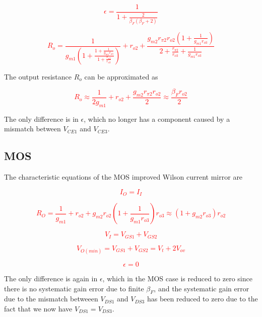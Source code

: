 \textcolor{red}{
\begin{equation}
\epsilon = \frac{1}{1+\frac{2}{\beta_{F} (\beta_{F} + 2)}}
\end{equation}
}

\textcolor{red}{
\begin{equation}
R_{o} = \frac{1}{g_{m1}\left(1 + \frac{1+\frac{1}{g_{m1}r_{o3}}}{1+\frac{r_{\pi2}}{r_{o3}}}\right)} + r_{o2} + \frac{g_{m2}r_{\pi2}r_{o2}\left(1+\frac{1}{g_{m1}r_{o3}}\right)}{2 + \frac{r_{\pi2}}{r_{o3}} + \frac{1}{g_{m1}r_{o3}}}
\end{equation}
}

The output resistance $R_{o}$ can be approximated as

\textcolor{red}{
\begin{equation}
R_{o} \approx \frac{1}{2g_{m1}} + r_{o2} + \frac{g_{m2}r_{\pi2}r_{o2}}{2} \approx \frac{\beta_{F} r_{o2}}{2}
\end{equation}
}

\par The only difference is in $\epsilon$, which no longer has a component caused by a mismatch between $V_{CE1}$ and $V_{CE3}$.

\subsection{MOS}
The characteristic equations of the MOS improved Wilson current mirror are

\textcolor{red}{
\begin{equation}
I_{O} = I_{I}
\end{equation}
}

\textcolor{red}{
\begin{equation}
R_{O} = \frac{1}{g_{m1}}+r_{o2}+g_{m2}r_{o2}\left(1+\frac{1}{g_{m1}r_{o3}}\right)r_{o3} \approx (1+g_{m2}r_{o3})r_{o2}
\end{equation}
}

\textcolor{red}{
\begin{equation}
V_{I} = V_{GS1}+V_{GS2}
\end{equation}
}

\textcolor{red}{
\begin{equation}
V_{O(min)} = V_{GS1}+V_{GS2} = V_{t}+2V_{ov}
\end{equation}
}

\textcolor{red}{
\begin{equation}
\epsilon = 0
\end{equation}
}

\par The only difference is again in $\epsilon$, which in the MOS case is reduced to zero since there is no systematic gain error due to finite $\beta_{F}$, and the systematic gain error due to the mismatch betweeen $V_{DS1}$ and $V_{DS3}$ has been reduced to zero due to the fact that we now have $V_{DS1} = V_{DS3}$.


